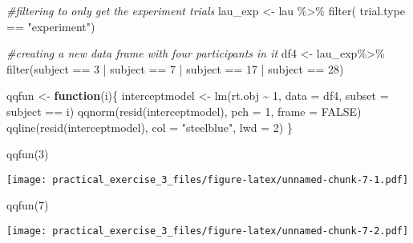 \documentclass[
]{article}
\newenvironment{Shaded}{\begin{snugshade}}{\end{snugshade}}
\newcommand{\AttributeTok}[1]{\textcolor[rgb]{0.77,0.63,0.00}{#1}}
\newcommand{\CommentTok}[1]{\textcolor[rgb]{0.56,0.35,0.01}{\textit{#1}}}
\newcommand{\ConstantTok}[1]{\textcolor[rgb]{0.00,0.00,0.00}{#1}}
\newcommand{\ControlFlowTok}[1]{\textcolor[rgb]{0.13,0.29,0.53}{\textbf{#1}}}
\newcommand{\DecValTok}[1]{\textcolor[rgb]{0.00,0.00,0.81}{#1}}
\newcommand{\FunctionTok}[1]{\textcolor[rgb]{0.00,0.00,0.00}{#1}}
\newcommand{\NormalTok}[1]{#1}
\newcommand{\OtherTok}[1]{\textcolor[rgb]{0.56,0.35,0.01}{#1}}
\newcommand{\SpecialCharTok}[1]{\textcolor[rgb]{0.00,0.00,0.00}{#1}}
\newcommand{\StringTok}[1]{\textcolor[rgb]{0.31,0.60,0.02}{#1}}
\begin{document}
\begin{Shaded}
\begin{Highlighting}[]
\CommentTok{\#filtering to only get the experiment trials}
\NormalTok{lau\_exp }\OtherTok{\textless{}{-}}\NormalTok{ lau }\SpecialCharTok{\%\textgreater{}\%} 
  \FunctionTok{filter}\NormalTok{( trial.type }\SpecialCharTok{==} \StringTok{"experiment"}\NormalTok{)}

\CommentTok{\#creating a new data frame with four participants in it}
\NormalTok{df4 }\OtherTok{\textless{}{-}}\NormalTok{  lau\_exp}\SpecialCharTok{\%\textgreater{}\%} 
  \FunctionTok{filter}\NormalTok{(subject }\SpecialCharTok{==} \StringTok{\textquotesingle{}3\textquotesingle{}} \SpecialCharTok{|}\NormalTok{ subject }\SpecialCharTok{==} \StringTok{\textquotesingle{}7\textquotesingle{}} \SpecialCharTok{|}\NormalTok{ subject }\SpecialCharTok{==} \StringTok{\textquotesingle{}17\textquotesingle{}} \SpecialCharTok{|}\NormalTok{ subject }\SpecialCharTok{==} \StringTok{\textquotesingle{}28\textquotesingle{}}\NormalTok{)}


\NormalTok{qqfun }\OtherTok{\textless{}{-}} \ControlFlowTok{function}\NormalTok{(i)\{}
\NormalTok{  interceptmodel }\OtherTok{\textless{}{-}} \FunctionTok{lm}\NormalTok{(rt.obj }\SpecialCharTok{\textasciitilde{}} \DecValTok{1}\NormalTok{, }\AttributeTok{data =}\NormalTok{ df4, }\AttributeTok{subset =}\NormalTok{ subject }\SpecialCharTok{==}\NormalTok{ i)}
  \FunctionTok{qqnorm}\NormalTok{(}\FunctionTok{resid}\NormalTok{(interceptmodel), }\AttributeTok{pch =} \DecValTok{1}\NormalTok{, }\AttributeTok{frame =} \ConstantTok{FALSE}\NormalTok{)}
  \FunctionTok{qqline}\NormalTok{(}\FunctionTok{resid}\NormalTok{(interceptmodel), }\AttributeTok{col =} \StringTok{"steelblue"}\NormalTok{, }\AttributeTok{lwd =} \DecValTok{2}\NormalTok{)}
\NormalTok{\}}


\FunctionTok{qqfun}\NormalTok{(}\DecValTok{3}\NormalTok{)}
\end{Highlighting}
\end{Shaded}

\texttt{[image: practical\_exercise\_3\_files/figure-latex/unnamed-chunk-7-1.pdf]}

\begin{Shaded}
\begin{Highlighting}[]
\FunctionTok{qqfun}\NormalTok{(}\DecValTok{7}\NormalTok{)}
\end{Highlighting}
\end{Shaded}

\texttt{[image: practical\_exercise\_3\_files/figure-latex/unnamed-chunk-7-2.pdf]}
\end{document}

